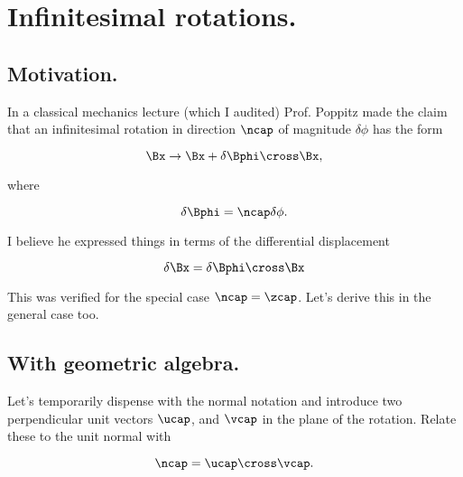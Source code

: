 
%

\chapter{Infinitesimal rotations.}
\label{chap:infinitesimalRotation}
{}
\date{Jan 27, 2012}

\beginArtWithToc

\section{Motivation.}

In a classical mechanics lecture (which I audited) Prof. Poppitz made the claim that an infinitesimal rotation in direction $\ncap$ of magnitude $\delta \phi$ has the form

\begin{equation}\label{eqn:continuumL6:10}
\Bx \rightarrow \Bx + \delta \Bphi \cross \Bx,
\end{equation}

where

\begin{equation}\label{eqn:continuumL6:30}
\delta \Bphi = \ncap \delta \phi.
\end{equation}

I believe he expressed things in terms of the differential displacement

\begin{equation}\label{eqn:continuumL6:50}
\delta \Bx = \delta \Bphi \cross \Bx
\end{equation}

This was verified for the special case $\ncap = \zcap$.  Let's derive this in the general case too.

\section{With geometric algebra.}

Let's temporarily dispense with the normal notation and introduce two perpendicular unit vectors $\ucap$, and $\vcap$ in the plane of the rotation.  Relate these to the unit normal with

\begin{equation}\label{eqn:continuumL6:70}
\ncap = \ucap \cross \vcap.
\end{equation}

